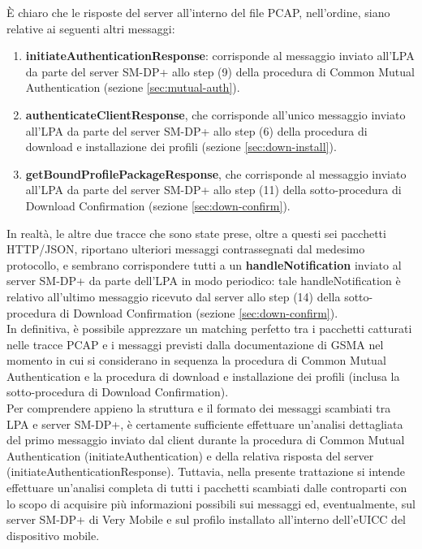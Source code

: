 \documentclass[10pt, oneside]{book}
\begin{document}
È chiaro che le risposte del server all'interno del file PCAP, nell'ordine, siano relative ai seguenti altri messaggi:
\begin{enumerate}
\item \textbf{initiateAuthenticationResponse}: corrisponde al messaggio inviato all'LPA da parte del server SM-DP+ allo step (9) della procedura di Common Mutual Authentication (sezione \ref{sec:mutual-auth}).
\item \textbf{authenticateClientResponse}, che corrisponde all'unico messaggio inviato all'LPA da parte del server SM-DP+ allo step (6) della procedura di download e installazione dei profili (sezione \ref{sec:down-install}).
\item \textbf{getBoundProfilePackageResponse}, che corrisponde al messaggio inviato all'LPA da parte del server SM-DP+ allo step (11) della sotto-procedura di Download Confirmation (sezione \ref{sec:down-confirm}).
\end{enumerate}
In realtà, le altre due tracce che sono state prese, oltre a questi sei pacchetti HTTP/JSON, riportano ulteriori messaggi contrassegnati dal medesimo protocollo, e sembrano corrispondere tutti a un \textbf{handleNotification} inviato al server SM-DP+ da parte dell'LPA in modo periodico: tale handleNotification è relativo all'ultimo messaggio ricevuto dal server allo step (14) della sotto-procedura di Download Confirmation (sezione \ref{sec:down-confirm}).\\
In definitiva, è possibile apprezzare un matching perfetto tra i pacchetti catturati nelle tracce PCAP e i messaggi previsti dalla documentazione di GSMA \cite{GSMA-docs-new} nel momento in cui si considerano in sequenza la procedura di Common Mutual Authentication e la procedura di download e installazione dei profili (inclusa la sotto-procedura di Download Confirmation).\\
Per comprendere appieno la struttura e il formato dei messaggi scambiati tra LPA e server SM-DP+, è certamente sufficiente effettuare un'analisi dettagliata del primo messaggio inviato dal client durante la procedura di Common Mutual Authentication (initiateAuthentication) e della relativa risposta del server (initiateAuthenticationResponse). Tuttavia, nella presente trattazione si intende effettuare un'analisi completa di tutti i pacchetti scambiati dalle controparti con lo scopo di acquisire più informazioni possibili sui messaggi ed, eventualmente, sul server SM-DP+ di Very Mobile e sul profilo installato all'interno dell'eUICC del dispositivo mobile.
\end{document}
